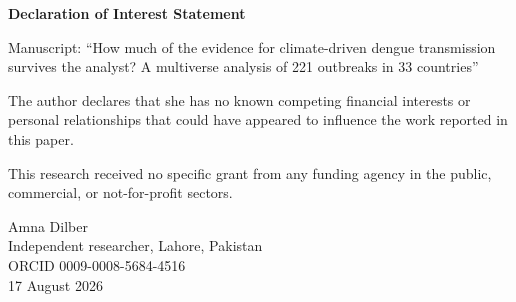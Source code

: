 \documentclass[11pt]{article}
\begin{document}
\textbf{Declaration of Interest Statement}

Manuscript: ``How much of the evidence for climate-driven dengue transmission
survives the analyst? A multiverse analysis of 221 outbreaks in 33 countries''

The author declares that she has no known competing financial interests or
personal relationships that could have appeared to influence the work reported
in this paper.

This research received no specific grant from any funding agency in the
public, commercial, or not-for-profit sectors.

\vspace{1.5em}
Amna Dilber\\
Independent researcher, Lahore, Pakistan\\
ORCID 0009-0008-5684-4516\\
17 August 2026
\end{document}
